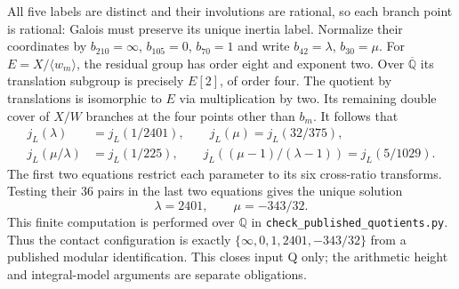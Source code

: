 All five labels are distinct and their involutions are rational, so
each branch point is rational: Galois must preserve its unique inertia
label. Normalize their coordinates by
$b_{210}=\infty$, $b_{105}=0$, $b_{70}=1$ and write
$b_{42}=\lambda$, $b_{30}=\mu$.
For $E=X/\langle w_m\rangle$, the residual group has order eight
and exponent two. Over $\overline{\mathbb Q}$ its translation subgroup
is precisely $E[2]$, of order four. The quotient by translations is
isomorphic to $E$ via multiplication by two. Its remaining double
cover of $X/W$ branches at the four points other than $b_m$.
It follows that
\[
\begin{split}
j_L(\lambda)&=j_L(1/2401),\qquad
j_L(\mu)=j_L(32/375),\\
j_L(\mu/\lambda)&=j_L(1/225),\qquad
j_L((\mu-1)/(\lambda-1))=j_L(5/1029).
\end{split}
\]
The first two equations restrict each parameter to its six
cross-ratio transforms. Testing their 36 pairs in the last two
equations gives the unique solution
\[
\lambda=2401,\qquad\mu=-343/32.
\]
This finite computation is performed over $\mathbb Q$ in
\texttt{check\_published\_quotients.py}. Thus the contact configuration
is exactly $\{\infty,0,1,2401,-343/32\}$ from a published modular
identification. This closes input Q only; the arithmetic height
and integral-model arguments are separate obligations.
